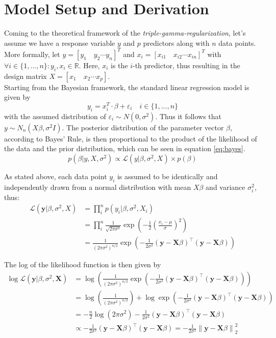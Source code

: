 \documentclass[12pt,a4paper]{article}
\newcommand{\norm}[1]{\left\lVert#1\right\rVert}
\begin{document}
\newpage
\section{Model Setup and Derivation}
Coming to the theoretical framework of the \textit{triple-gamma-regularization}, let's assume we have a response variable $y$ and $p$ predictors along with $n$ data points. More formally, let $y=[y_1  \quad y_2 \cdots y_n]^T$ and $x_i = [x_{i1} \quad x_{i2} \cdots x_{in}]^T$ with $\forall i\in \{1,...,n\}: y_i, x_i \in \mathbb{R}$. Here, $x_i$ is the $i$-th predictor, thus resulting in the design matrix $X = [x_1 \quad x_2 \cdots x_p]$. \\

Starting from the Bayesian framework, the standard linear regression model is given by
\[
y_i = x_i^T\cdot \beta + \varepsilon_i \quad i\in \{1,...,n\} 
\]
with the assumed distribution of $\varepsilon_i \sim N(0,\sigma^2)$. Thus it follows that $y\sim N_n(X\beta,\sigma^2I)$. The posterior distribution of the parameter vector $\beta$, according to Bayes' Rule, is then proportional to the product of the likelihood of the data and the prior distribution, which can be seen in equation \ref{eq:bayes}.
\begin{equation}\label{eq:bayes}
p(\beta|y, X, \sigma^2) \propto \mathcal{L}(y|\beta, \sigma^2, X)\times p(\beta)
\end{equation}	

As stated above, each data point $y_i$ is assumed to be identically and independently drawn from a normal distribution with mean $X\beta$ and variance $\sigma_i^2$, thus:
\begin{align}
\mathcal{L}(\mathbf{y}|\beta, \sigma^2, X) 	&= \prod_i^n p(y_i|\beta, \sigma^2, X_i) \nonumber\\
						&= \prod_i^n \frac{1}{\sqrt{2\pi\sigma^2}} \exp\left(-\frac{1}{2}\left(\frac{x_i-\mu}{\sigma}\right)^2\right) \nonumber\\
						&= \frac{1}{(2\pi\sigma^2)^{n/2}}\exp\left(-\frac{1}{2\sigma^2}(\mathbf{y}-\mathbf{X}\beta)^\top(\mathbf{y}-\mathbf{X}\beta)\right) \label{eq:likelihood}
\end{align}

The log of the likelihood function is then given by 
\begin{align*}
\log \mathcal{L}( \mathbf{y} |\beta, \sigma^2 , \mathbf{X}) &= \log \left( \frac{1}{(2\pi\sigma^2)^{n/2}} \exp\left(-\frac{1}{2\sigma^2} (\mathbf{y} - \mathbf{X}\beta)^\top (\mathbf{y} - \mathbf{X}\beta)\right) \right) \\
&= \log \left( \frac{1}{(2\pi\sigma^2)^{n/2}} \right) + \log \exp\left(-\frac{1}{2\sigma^2} (\mathbf{y} - \mathbf{X}\beta)^\top (\mathbf{y} - \mathbf{X}\beta)\right) \\
&= -\frac{n}{2} \log(2\pi\sigma^2) - \frac{1}{2\sigma^2} (\mathbf{y} - \mathbf{X}\beta)^\top (\mathbf{y} - \mathbf{X}\beta)\\
&\propto - \frac{1}{2\sigma^2} (\mathbf{y} - \mathbf{X}\beta)^\top (\mathbf{y} - \mathbf{X}\beta) = - \frac{1}{2\sigma^2}\norm{\mathbf{y} - \mathbf{X}\beta}_2^2\\
\end{align*}
\end{document}
